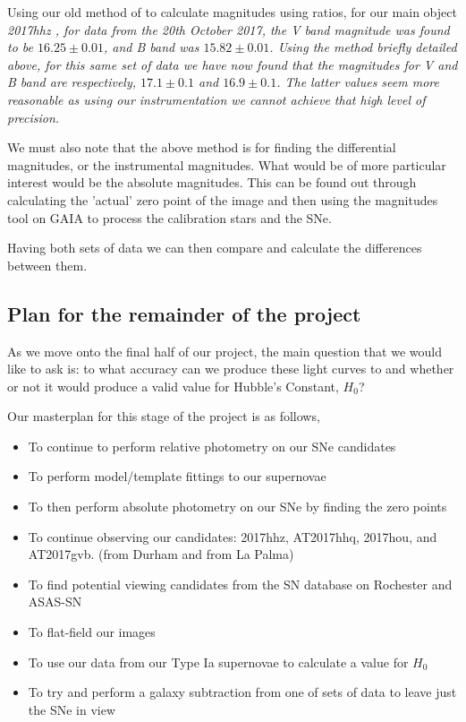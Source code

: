 \documentclass[twocolumn]{revtex4}
\begin{document}
Using our old method of to calculate magnitudes using ratios, for our main object \em{2017hhz }\em, for data from the 20th October 2017, the V band magnitude was found to be $16.25\pm0.01$, and B band was $15.82\pm0.01$. Using the method briefly detailed above, for this same set of data we have now found that the magnitudes for V and B band are respectively, $17.1\pm0.1$ and $16.9\pm0.1$. The latter values seem more reasonable as using our instrumentation we cannot achieve that high level of precision.

We must also note that the above method is for finding the differential magnitudes, or the instrumental magnitudes. What would be of more particular interest would be the absolute magnitudes. This can be found out through calculating the 'actual' zero point of the image and then using the magnitudes tool on GAIA to process the calibration stars and the SNe.

Having both sets of data we can then compare and calculate the differences between them.

\vspace{-3ex}
\subsection*{Plan for the remainder of the project}
\vspace{-2ex}
As we move onto the final half of our project, the main question that we would like to ask is: to what accuracy can we produce these light curves to and whether or not it would produce a valid value for Hubble's Constant, $H_0$?

Our masterplan for this stage of the project is as follows,
\begin{itemize}
 \item To continue to perform relative photometry on our SNe candidates
 \item To perform model/template fittings to our supernovae
 \item To then perform absolute photometry on our SNe by finding the zero points
 \item To continue observing our candidates: 2017hhz, AT2017hhq, 2017hou, and AT2017gvb. (from Durham and from La Palma)
 \item To find potential viewing candidates from the SN database on Rochester and ASAS-SN
 \item To flat-field our images
 \item To use our data from our Type Ia supernovae to calculate a value for $H_0$
 \item To try and perform a galaxy subtraction from one of sets of data to leave just the SNe in view

\end{itemize}
\end{document}
